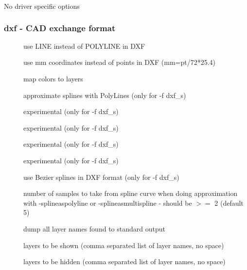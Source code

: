\documentclass[english,a4paper]{article}
\begin{document}
No driver specific options
\subsubsection{dxf - CAD exchange format}
\begin{description}
\item[] 
use LINE instead of POLYLINE in DXF


\item[] 
use mm coordinates instead of points in DXF (mm=pt/72*25.4)


\item[] 
map colors to layers


\item[] 
approximate splines with PolyLines (only for -f dxf\_s)


\item[] 
experimental (only for -f dxf\_s)


\item[] 
experimental (only for -f dxf\_s)


\item[] 
experimental (only for -f dxf\_s)


\item[] 
experimental (only for -f dxf\_s)


\item[] 
use Bezier splines in DXF format (only for -f dxf\_s)


\item[] 
number of samples to take from spline curve when doing approximation with -splineaspolyline or -splineasmultispline - should be $>=$ 2 (default 5)


\item[] 
dump all layer names found to standard output


\item[] 
layers to be shown (comma separated list of layer names, no space)


\item[] 
layers to be hidden (comma separated list of layer names, no space)


\end{description}
\end{document}
